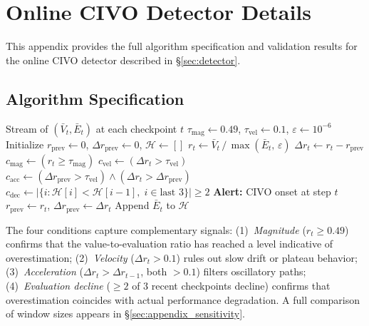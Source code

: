 \section{Online CIVO Detector Details}
\label{sec:detector_appendix}

This appendix provides the full algorithm specification and validation results for the online CIVO detector described in \S\ref{sec:detector}.

\subsection{Algorithm Specification}

\begin{algorithm}[h]
\caption{Online CIVO Detector. Monitors the value-to-evaluation ratio $r_t = \bar{V}_t / \bar{E}_t$ (not NVE) for superlinear growth indicative of CIVO onset.}
\label{alg:civo_detector}
\begin{algorithmic}[1]
\REQUIRE Stream of $(\bar{V}_t, \bar{E}_t)$ at each checkpoint $t$
\STATE $\tau_\text{mag} \leftarrow 0.49$, \quad $\tau_\text{vel} \leftarrow 0.1$, \quad $\varepsilon \leftarrow 10^{-6}$
\STATE Initialize $r_\text{prev} \leftarrow 0$, $\Delta r_\text{prev} \leftarrow 0$, $\mathcal{H} \leftarrow []$
  \STATE $r_t \leftarrow \bar{V}_t \,/\, \max(\bar{E}_t,\, \varepsilon)$
  \STATE $\Delta r_t \leftarrow r_t - r_\text{prev}$
  \STATE $c_\text{mag} \leftarrow (r_t \geq \tau_\text{mag})$
  \STATE $c_\text{vel} \leftarrow (\Delta r_t > \tau_\text{vel})$
  \STATE $c_\text{acc} \leftarrow (\Delta r_\text{prev} > \tau_\text{vel}) \wedge (\Delta r_t > \Delta r_\text{prev})$
  \STATE $c_\text{dec} \leftarrow \bigl|\{i : \mathcal{H}[i] < \mathcal{H}[i{-}1],\; i \in \text{last 3}\}\bigr| \geq 2$
    \STATE \textbf{Alert:} CIVO onset at step $t$
  \ENDIF
  \STATE $r_\text{prev} \leftarrow r_t$, \quad $\Delta r_\text{prev} \leftarrow \Delta r_t$
  \STATE Append $\bar{E}_t$ to $\mathcal{H}$
\ENDFOR
\end{algorithmic}
\end{algorithm}

The four conditions capture complementary signals: (1)~\emph{Magnitude} ($r_t \geq 0.49$) confirms that the value-to-evaluation ratio has reached a level indicative of overestimation; (2)~\emph{Velocity} ($\Delta r_t > 0.1$) rules out slow drift or plateau behavior; (3)~\emph{Acceleration} ($\Delta r_t > \Delta r_{t-1}$, both $> 0.1$) filters oscillatory paths; (4)~\emph{Evaluation decline} ($\geq 2$ of 3 recent checkpoints decline) confirms that overestimation coincides with actual performance degradation. A full comparison of window sizes appears in \S\ref{sec:appendix_sensitivity}.


